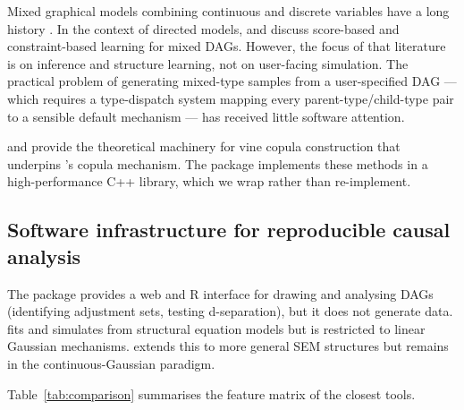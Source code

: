 \documentclass[article]{jss}
\begin{document}
Mixed graphical models combining continuous and discrete variables have a long history \citep{lauritzen1989graphical, cox1993linear}. In the context of directed models, \citet{heckerman1995learning} and \citet{lauritzen2002chain} discuss score-based and constraint-based learning for mixed DAGs. However, the focus of that literature is on inference and structure learning, not on user-facing simulation. The practical problem of generating mixed-type samples from a user-specified DAG --- which requires a type-dispatch system mapping every parent-type/child-type pair to a sensible default mechanism --- has received little software attention.

\citet{nagler2016evading} and \citet{czado2019analyzing} provide the theoretical machinery for vine copula construction that underpins 's copula mechanism. The  package \citep{nagler2021rvinecopulib} implements these methods in a high-performance C++ library, which we wrap rather than re-implement.

\subsection{Software infrastructure for reproducible causal analysis}

The  package \citep{textor2016dagitty} provides a web and R interface for drawing and analysing DAGs (identifying adjustment sets, testing d-separation), but it does not generate data.  \citep{rosseel2012lavaan} fits and simulates from structural equation models but is restricted to linear Gaussian mechanisms.  \citep{neale2016openmx} extends this to more general SEM structures but remains in the continuous-Gaussian paradigm.

Table~\ref{tab:comparison} summarises the feature matrix of the closest tools.
\end{document}
